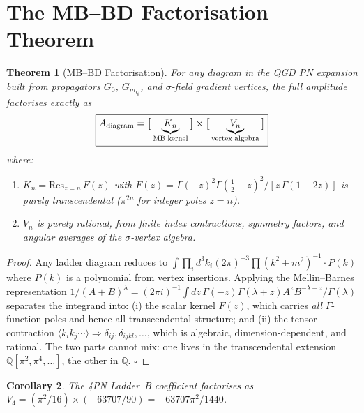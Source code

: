 \documentclass[11pt,a4paper]{article}
\theoremstyle{plain}
\newtheorem{theorem}{Theorem}[section]
\newtheorem{corollary}[theorem]{Corollary}
\theoremstyle{definition}
\theoremstyle{remark}
\newcommand{\mQ}{m_Q}
\newcommand{\half}{\tfrac{1}{2}}
\begin{document}
\section{The MB--BD Factorisation Theorem}
\label{sec:MBBD}

\begin{theorem}[MB--BD Factorisation]
\label{thm:MBBD}
For any diagram in the QGD PN expansion built from propagators
$G_0$, $G_{\mQ}$, and $\sigma$-field gradient vertices, the full
amplitude factorises exactly as
\begin{equation}
  \boxed{A_{\rm diagram} = \bigl[\,\underbrace{K_n}_{\rm MB\;kernel}\,\bigr]
  \times \bigl[\,\underbrace{V_n}_{\rm vertex\;algebra}\,\bigr]}
  \label{eq:factorisation}
\end{equation}
where:
\begin{enumerate}[nosep,label=(\roman*)]
  \item $K_n = \mathrm{Res}_{z=n}\,F(z)$ with
    $F(z) = \Gamma(-z)^2\Gamma(\half+z)^2/[z\,\Gamma(1{-}2z)]$
    is \emph{purely transcendental} ($\pi^{2n}$ for integer poles $z=n$).
  \item $V_n$ is \emph{purely rational}, from finite index contractions,
    symmetry factors, and angular averages of the $\sigma$-vertex algebra.
\end{enumerate}
\end{theorem}

\begin{proof}
Any ladder diagram reduces to
$\int\!\prod_i d^3k_i(2\pi)^{-3}\prod(k^2+m^2)^{-1}\cdot P(k)$
where $P(k)$ is a polynomial from vertex insertions.
Applying the Mellin--Barnes representation
$1/(A{+}B)^\lambda = (2\pi i)^{-1}\int dz\,\Gamma({-}z)\Gamma(\lambda{+}z)
A^z B^{-\lambda-z}/\Gamma(\lambda)$ separates the integrand into:
(i) the scalar kernel $F(z)$, which carries \emph{all} $\Gamma$-function
poles and hence all transcendental structure; and (ii) the tensor
contraction $\langle k_i k_j\cdots\rangle\Rightarrow
\delta_{ij}, \delta_{ijkl},\ldots$, which is algebraic, dimension-dependent,
and rational.  The two parts cannot mix: one lives in the transcendental
extension $\mathbb{Q}[\pi^2,\pi^4,\ldots]$, the other in $\mathbb{Q}$.
$\square$
\end{proof}

\begin{corollary}
The 4PN Ladder~B coefficient factorises as
$V_4 = (\pi^2/16)\times(-63707/90) = -63707\pi^2/1440$.
\end{corollary}
\end{document}
